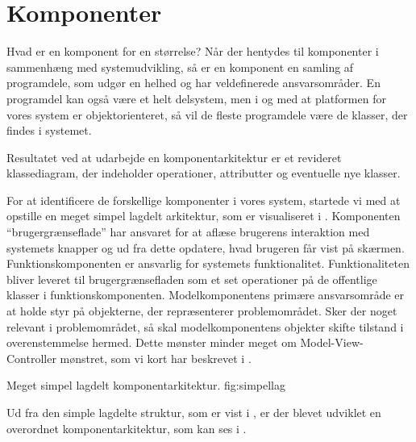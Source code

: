 \section{Komponenter}
\label{sec:komponenter}
Hvad er en komponent for en størrelse? Når der hentydes til komponenter i sammenhæng med systemudvikling, så er en komponent en samling af programdele, som udgør en helhed og har veldefinerede ansvarsområder. En programdel kan også være et helt delsystem, men i og med at platformen for vores system er objektorienteret, så vil de fleste programdele være de klasser, der findes i systemet. 

Resultatet ved at udarbejde en komponentarkitektur er et revideret klassediagram, der indeholder operationer, attributter og eventuelle nye klasser.

For at identificere de forskellige komponenter i vores system, startede vi med at opstille en meget simpel lagdelt arkitektur, som er visualiseret i . 
Komponenten ``brugergrænseflade'' har ansvaret for at aflæse brugerens interaktion med systemets knapper og ud fra dette opdatere, hvad brugeren får vist på skærmen. 
Funktionskomponenten er ansvarlig for systemets funktionalitet. Funktionaliteten bliver leveret til brugergrænsefladen som et set operationer på de offentlige klasser i funktionskomponenten. 
Modelkomponentens primære ansvarsområde er at holde styr på objekterne, der repræsenterer problemområdet. Sker der noget relevant i problemområdet, så skal modelkomponentens objekter skifte tilstand i overenstemmelse hermed. 
Dette mønster minder meget om Model-View-Controller mønstret, som vi kort har beskrevet i .

	{Meget simpel lagdelt komponentarkitektur.}
	{fig:simpellag}

Ud fra den simple lagdelte struktur, som er vist i , er der blevet udviklet en overordnet komponentarkitektur, som kan ses i .




